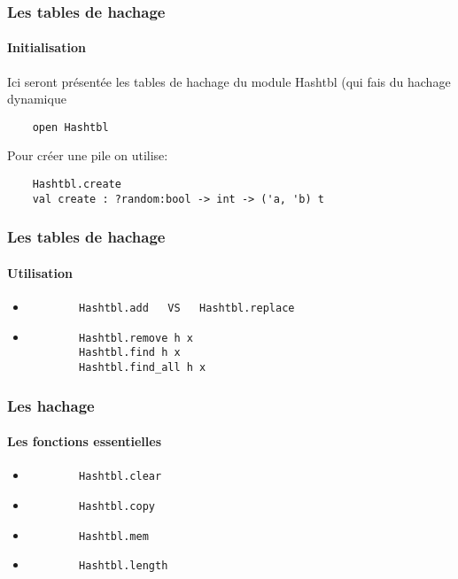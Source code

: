 \begin{frame}[fragile]
\frametitle{Les tables de hachage}
\framesubtitle{Initialisation}
	Ici seront présentée les tables de hachage du module Hashtbl (qui fais du hachage dynamique
	\begin{lstlisting}
	open Hashtbl
	\end{lstlisting}
	Pour créer une pile on utilise:
	\begin{lstlisting}
	Hashtbl.create
	val create : ?random:bool -> int -> ('a, 'b) t
	\end{lstlisting}
\end{frame}

\begin{frame}[fragile]
\frametitle{Les tables de hachage}
\framesubtitle{Utilisation}
	\begin{itemize}
	
	\item
		\begin{lstlisting}
		Hashtbl.add   VS   Hashtbl.replace
		\end{lstlisting}	
	
	\item
		\begin{lstlisting}
		Hashtbl.remove h x
		Hashtbl.find h x
		Hashtbl.find_all h x
		\end{lstlisting}	

	\end{itemize}


\end{frame}

\begin{frame}[fragile]
\frametitle{Les hachage}
\framesubtitle{Les fonctions essentielles}
	\begin{itemize}
	
	\item
		\begin{lstlisting}
		Hashtbl.clear
		\end{lstlisting}

	\item
		\begin{lstlisting}
		Hashtbl.copy
		\end{lstlisting}	

	\item
		\begin{lstlisting}
		Hashtbl.mem
		\end{lstlisting}	

	\item
		\begin{lstlisting}
		Hashtbl.length
		\end{lstlisting}

	\end{itemize}

\end{frame}











